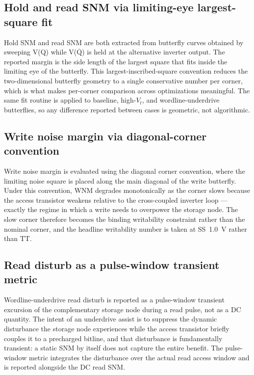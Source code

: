 \documentclass[pdflatex,sn-mathphys-num]{sn-jnl}%
\theoremstyle{thmstyleone}%
\theoremstyle{thmstyletwo}%
\theoremstyle{thmstylethree}%
\begin{document}
\subsection{Hold and read SNM via limiting-eye largest-square fit}\label{sec:setup-snm}

Hold SNM and read SNM are both extracted from butterfly curves obtained by sweeping V(Q) while V($\overline{\mathrm{Q}}$) is held at the alternative inverter output. The reported margin is the side length of the largest square that fits inside the limiting eye of the butterfly. This largest-inscribed-square convention reduces the two-dimensional butterfly geometry to a single conservative number per corner, which is what makes per-corner comparison across optimizations meaningful. The same fit routine is applied to baseline, high-$V_t$, and wordline-underdrive butterflies, so any difference reported between cases is geometric, not algorithmic.

\subsection{Write noise margin via diagonal-corner convention}\label{sec:setup-wnm}

Write noise margin is evaluated using the diagonal corner convention, where the limiting noise square is placed along the main diagonal of the write butterfly. Under this convention, WNM degrades monotonically as the corner slows because the access transistor weakens relative to the cross-coupled inverter loop — exactly the regime in which a write needs to overpower the storage node. The slow corner therefore becomes the binding writability constraint rather than the nominal corner, and the headline writability number is taken at SS~1.0~V rather than TT.

\subsection{Read disturb as a pulse-window transient metric}\label{sec:setup-disturb}

Wordline-underdrive read disturb is reported as a pulse-window transient excursion of the complementary storage node during a read pulse, not as a DC quantity. The intent of an underdrive assist is to suppress the dynamic disturbance the storage node experiences while the access transistor briefly couples it to a precharged bitline, and that disturbance is fundamentally transient: a static SNM by itself does not capture the entire benefit. The pulse-window metric integrates the disturbance over the actual read access window and is reported alongside the DC read SNM.
\end{document}
